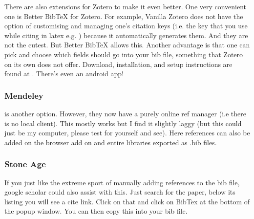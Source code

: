     There are also extensions for Zotero to make it even better. One very convenient one is Better BibTeX for Zotero. For example, Vanilla Zotero does not have the option of customising and managing one’s citation keys (i.e. the key that you use while citing in latex e.g. \texttt{\citep{ratt2020}}) because it automatically generates them. And they are not the cutest. But Better BibTeX allows this. Another advantage is that one can pick and choose which fields should go into your bib file, something that Zotero on its own does not offer. Download, installation, and setup instructions are found at  . There’s even an android app! 


\subsubsection*{Mendeley}
     is another option. However, they now have a purely online ref manager (i.e there is no local client). This mostly works but I find it slightly laggy (but this could just be my computer, please test for yourself and see). Here references can also be added on the browser add on and entire libraries exported as .bib files. 

\subsubsection*{Stone Age}
    If you just like the extreme sport of manually adding references to the bib file, google scholar could also assist with this. Just search for the paper, below its listing you will see a cite link. Click on that and click on BibTex at the bottom of the popup window. You can then copy this into your bib file.